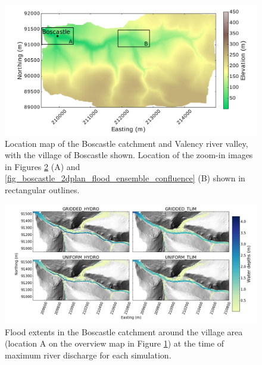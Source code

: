 \begin{figure}[!htbp]
\includegraphics[width=14cm]{chp_flood_figs_scripts/fig_boscastle_catchment_insets.png}
\caption{Location map of the Boscastle catchment and Valency river valley, with the village of Boscastle shown. Location of the zoom-in images in Figures \ref{fig_boscastle_2dplan_flood_ensemble_town} (A) and \ref{fig_boscastle_2dplan_flood_ensemble_confluence} (B) shown in rectangular outlines.}
\label{fig_boscastle_2dplan_inset_loc}
\end{figure}

\begin{figure}
\includegraphics[width=24cm]{chp_flood_figs_scripts/fig_boscastle_flood_enseble_town.png}
\caption{Flood extents in the Boscastle catchment around the village area (location A on the overview map in Figure \ref{fig_boscastle_2dplan_inset_loc}) at the time of maximum river discharge for each simulation. }
\label{fig_boscastle_2dplan_flood_ensemble_town}
\end{figure}

